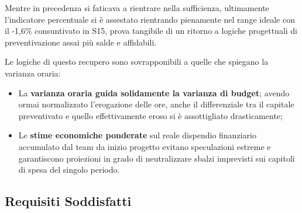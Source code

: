 \documentclass[a4paper,11pt,oneside]{scrartcl}
\begin{document}
Mentre in precedenza si faticava a rientrare nella sufficienza, ultimamente l'indicatore percentuale si è assestato rientrando pienamente nel range ideale con il -1,6\% consuntivato in S15, prova tangibile di un ritorno a logiche progettuali di preventivazione assai più salde e affidabili.

Le logiche di questo recupero sono sovrapponibili a quelle che spiegano la varianza oraria:
\begin{itemize}
    \item La \textbf{varianza oraria guida solidamente la varianza di budget}; avendo ormai normalizzato l'erogazione delle ore, anche il differenziale tra il capitale preventivato e quello effettivamente eroso si è assottigliato drasticamente;
    \item Le \textbf{stime economiche ponderate} sul reale dispendio finanziario accumulato dal team da inizio progetto evitano speculazioni estreme e garantiscono proiezioni in grado di neutralizzare sbalzi imprevisti sui capitoli di spesa del singolo periodo.
\end{itemize}

\subsection{Requisiti Soddisfatti}
\end{document}
